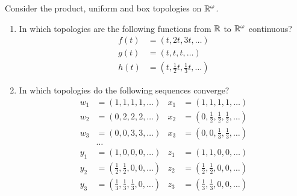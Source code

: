 \documentclass[a4paper, 12pt]{article}
\begin{document}
\begin{problem} 
    Consider the product, uniform and box topologies on $\mathbb{R}^\omega$.
    \begin{enumerate}
    \item In which topologies are the following functions from $\mathbb{R}$ to $\mathbb{R}^\omega$ continuous?
        \begin{align*}
            f(t) &= (t, 2t, 3t, \ldots) \\
            g(t) &= (t, t, t, \ldots) \\
            h(t) &= (t, \frac{1}{2} t, \frac{1}{3}t, \ldots)
        \end{align*}
    \item In which topologies do the following sequences converge?
        \begin{align*}
            w_1 &= (1, 1, 1, 1,\ldots) &x_1 &= (1, 1, 1, 1,\ldots)\\
            w_2 &= (0, 2, 2, 2,\ldots) &x_2 &= (0, \frac{1}{2}, \frac{1}{2}, \frac{1}{2}, \ldots) \\
            w_3 &= (0, 0, 3, 3,\ldots)  &x_3 &= (0, 0, \frac{1}{3}, \frac{1}{3}, \ldots)\\
            &\ldots \\
            y_1 &= (1, 0, 0, 0, \ldots) & z_1 &= (1, 1, 0, 0, \ldots)\\
            y_2 &= (\frac{1}{2}, \frac{1}{2}, 0, 0, \ldots) &  z_2 &= (\frac{1}{2}, \frac{1}{2}, 0, 0, \ldots) \\
            y_3 &= (\frac{1}{3}, \frac{1}{3}, \frac{1}{3}, 0, \ldots) & z_3 &= (\frac{1}{3}, \frac{1}{3}, 0, 0, \ldots)\\
        \end{align*}
    \end{enumerate}
\end{problem}
\end{document}
